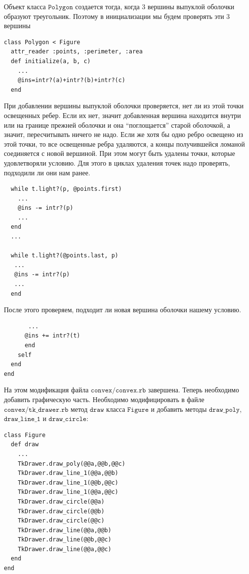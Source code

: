 Объект класса $\texttt{Polygon}$ создается тогда, когда 3 вершины выпуклой оболочки образуют треугольник. Поэтому в инициализации мы будем проверять эти 3 вершины
\begin{small}
\begin{verbatim}
class Polygon < Figure
  attr_reader :points, :perimeter, :area
  def initialize(a, b, c) 
    ...
    @ins=intr?(a)+intr?(b)+intr?(c)
  end
\end{verbatim}
\end{small}	  
При добавлении вершины выпуклой оболочки проверяется, нет ли из этой точки освещенных ребер. Если их нет, значит добавленная вершина находится внутри или на границе прежней оболочки и она ``поглощается'' старой оболочкой, а значит, пересчитывать ничего не надо. Если же хотя бы одно ребро освещено из этой точки, то все освещенные ребра удаляются, а концы получившейся ломаной соединяется с новой вершиной. При этом могут быть удалены точки, которые удовлетворяли условию. Для этого в циклах удаления точек надо проверять, подходили ли они нам ранее.
\begin{small}
\begin{verbatim}
  while t.light?(p, @points.first)
    ...
    @ins -= intr?(p)
    ...
  end
  ...

  while t.light?(@points.last, p)
   ...
   @ins -= intr?(p)
   ...
  end
\end{verbatim}
\end{small} 
После этого проверяем, подходит ли новая вершина оболочки нашему условию.
\begin{small}
\begin{verbatim}
       ... 
      @ins += intr?(t)
      end
    self
  end
end
\end{verbatim}
\end{small}

На этом модификация файла $\texttt{convex/convex.rb}$ завершена. Теперь необходимо добавить графическую часть. Необходимо модифицировать в файле \sloppy $\texttt{convex/tk\_drawer.rb}$ метод $\texttt{draw}$ класса $\texttt{Figure}$ и добавить методы $\texttt{draw\_poly}$, $\texttt{draw\_line\_1}$ и $\texttt{draw\_circle}$:
\begin{small}
\begin{verbatim}
class Figure
  def draw
    ...
    TkDrawer.draw_poly(@@a,@@b,@@c)
    TkDrawer.draw_line_1(@@a,@@b)
    TkDrawer.draw_line_1(@@b,@@c)
    TkDrawer.draw_line_1(@@a,@@c)
    TkDrawer.draw_circle(@@a)
    TkDrawer.draw_circle(@@b)
    TkDrawer.draw_circle(@@c)
    TkDrawer.draw_line(@@a,@@b)
    TkDrawer.draw_line(@@b,@@c)
    TkDrawer.draw_line(@@a,@@c)
  end
end
\end{verbatim}
\end{small}

